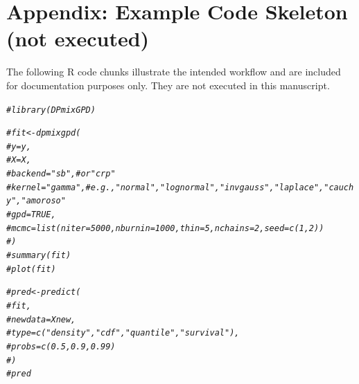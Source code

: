 \documentclass[article]{jss}\usepackage[]{graphicx}\usepackage[]{xcolor}
\makeatletter
\newcommand{\hlcom}[1]{\textcolor[rgb]{0.678,0.584,0.686}{\textit{#1}}}%
\newenvironment{kframe}{%
 \def\at@end@of@kframe{}%
 \ifinner\ifhmode%
  \def\at@end@of@kframe{\end{minipage}}%
  \begin{minipage}{\columnwidth}%
 \fi\fi%
 \def\FrameCommand##1{\hskip\@totalleftmargin \hskip-\fboxsep
 \colorbox{shadecolor}{##1}\hskip-\fboxsep
     \hskip-\linewidth \hskip-\@totalleftmargin \hskip\columnwidth}%
 \MakeFramed {\advance\hsize-\width
   \@totalleftmargin\z@ \linewidth\hsize
   \@setminipage}}%
 {\par\unskip\endMakeFramed%
 \at@end@of@kframe}
\newenvironment{knitrout}{}{} %
\makeatother
\begin{document}
\section*{Appendix: Example Code Skeleton (not executed)}
The following \textsf{R} code chunks illustrate the intended workflow and are included for documentation purposes only.
They are not executed in this manuscript.

\begin{knitrout}
\color{fgcolor}\begin{kframe}
\begin{alltt}
\hlcom{# library(DPmixGPD)}

\hlcom{# fit <- dpmixgpd(}
\hlcom{#   y = y,}
\hlcom{#   X = X,}
\hlcom{#   backend = "sb",        # or "crp"}
\hlcom{#   kernel  = "gamma",     # e.g., "normal", "lognormal", "invgauss", "laplace", "cauchy", "amoroso"}
\hlcom{#   gpd     = TRUE,}
\hlcom{#   mcmc    = list(niter = 5000, nburnin = 1000, thin = 5, nchains = 2, seed = c(1,2))}
\hlcom{# )}
\hlcom{# summary(fit)}
\hlcom{# plot(fit)}
\end{alltt}
\end{kframe}
\end{knitrout}

\begin{knitrout}
\color{fgcolor}\begin{kframe}
\begin{alltt}
\hlcom{# pred <- predict(}
\hlcom{#   fit,}
\hlcom{#   newdata = Xnew,}
\hlcom{#   type = c("density","cdf","quantile","survival"),}
\hlcom{#   probs = c(0.5, 0.9, 0.99)}
\hlcom{# )}
\hlcom{# pred}
\end{alltt}
\end{kframe}
\end{knitrout}


\end{document}
